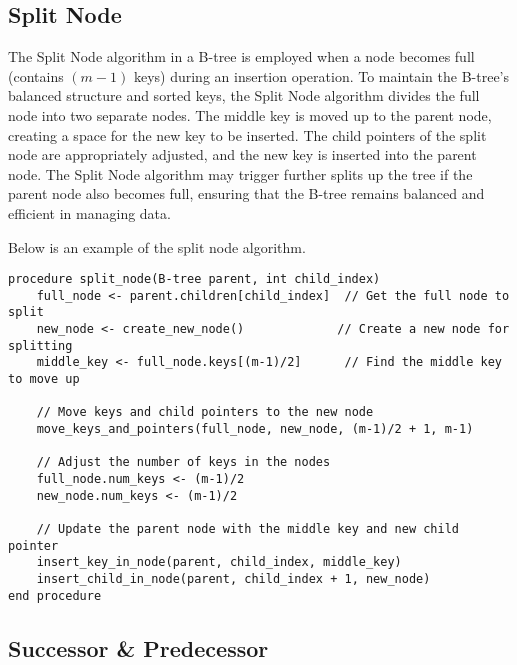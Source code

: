 \subsection*{Split Node}

The Split Node algorithm in a B-tree is employed when a node becomes full (contains $(m-1)$ keys) during an insertion operation. To maintain the B-tree's balanced structure and sorted keys, the Split Node 
algorithm divides the full node into two separate nodes. The middle key is moved up to the parent node, creating a space for the new key to be inserted. The child pointers of the split node are 
appropriately adjusted, and the new key is inserted into the parent node. The Split Node algorithm may trigger further splits up the tree if the parent node also becomes full, ensuring that the B-tree 
remains balanced and efficient in managing data.

\begin{highlight}

Below is an example of the split node algorithm.

\horizontalline

\begin{verbatim}
procedure split_node(B-tree parent, int child_index)
    full_node <- parent.children[child_index]  // Get the full node to split
    new_node <- create_new_node()             // Create a new node for splitting
    middle_key <- full_node.keys[(m-1)/2]      // Find the middle key to move up

    // Move keys and child pointers to the new node
    move_keys_and_pointers(full_node, new_node, (m-1)/2 + 1, m-1)

    // Adjust the number of keys in the nodes
    full_node.num_keys <- (m-1)/2
    new_node.num_keys <- (m-1)/2

    // Update the parent node with the middle key and new child pointer
    insert_key_in_node(parent, child_index, middle_key)
    insert_child_in_node(parent, child_index + 1, new_node)
end procedure
\end{verbatim}

\end{highlight}

\subsection*{Successor \& Predecessor}

